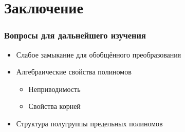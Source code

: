 \section*{Заключение}
\begin{frame}
\frametitle{Вопросы для дальнейшего изучения}
\begin{itemize}
\item Слабое замыкание для обобщённого преобразования
\item Алгебраические свойства полиномов
\begin{itemize}
\item Неприводимость
\item Свойства корней
\end{itemize}
\item Структура полугруппы предельных полиномов
\end{itemize}
\end{frame}